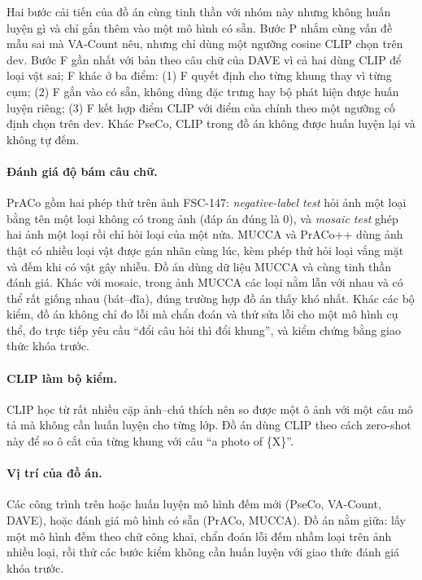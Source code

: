 \documentclass[12pt,a4paper]{article}
\begin{document}
Hai bước cải tiến của đồ án cùng tinh thần với nhóm này nhưng không huấn luyện gì và chỉ gắn thêm vào một mô hình có sẵn. Bước P nhắm cùng vấn đề mẫu sai mà VA-Count nêu, nhưng chỉ dùng một ngưỡng cosine CLIP chọn trên dev. Bước F gần nhất với bản theo câu chữ của DAVE vì cả hai dùng CLIP để loại vật sai; F khác ở ba điểm: (1) F quyết định cho từng khung thay vì từng cụm; (2) F gắn vào \cgdpp{} có sẵn, không dùng đặc trưng hay bộ phát hiện được huấn luyện riêng; (3) F kết hợp điểm CLIP với điểm của chính \cgdpp{} theo một ngưỡng cố định chọn trên dev. Khác PseCo, CLIP trong đồ án không được huấn luyện lại và không tự đếm.

\paragraph{Đánh giá độ bám câu chữ.}
PrACo \parencite{ciampi2025praco} gồm hai phép thử trên ảnh FSC-147: \emph{negative-label test} hỏi ảnh một loại bằng tên một loại không có trong ảnh (đáp án đúng là 0), và \emph{mosaic test} ghép hai ảnh một loại rồi chỉ hỏi loại của một nửa. MUCCA và PrACo++ \parencite{pacini2026mucca} dùng ảnh thật có nhiều loại vật được gán nhãn cùng lúc, kèm phép thử hỏi loại vắng mặt và đếm khi có vật gây nhiễu. Đồ án dùng dữ liệu MUCCA và cùng tinh thần đánh giá. Khác với mosaic, trong ảnh MUCCA các loại nằm lẫn với nhau và có thể rất giống nhau (bát--đĩa), đúng trường hợp đồ án thấy khó nhất. Khác các bộ kiểm, đồ án không chỉ đo lỗi mà chẩn đoán và thử sửa lỗi cho một mô hình cụ thể, đo trực tiếp yêu cầu ``đổi câu hỏi thì đổi khung'', và kiểm chứng bằng giao thức khóa trước.

\paragraph{CLIP làm bộ kiểm.}
CLIP \parencite{radford2021clip} học từ rất nhiều cặp ảnh--chú thích nên so được một ô ảnh với một câu mô tả mà không cần huấn luyện cho từng lớp. Đồ án dùng CLIP theo cách zero-shot này để so ô cắt của từng khung với câu ``a photo of \{X\}''.

\paragraph{Vị trí của đồ án.}
Các công trình trên hoặc huấn luyện mô hình đếm mới (PseCo, VA-Count, DAVE), hoặc đánh giá mô hình có sẵn (PrACo, MUCCA). Đồ án nằm giữa: lấy một mô hình đếm theo chữ công khai, chẩn đoán lỗi đếm nhầm loại trên ảnh nhiều loại, rồi thử các bước kiểm không cần huấn luyện với giao thức đánh giá khóa trước.
\end{document}

